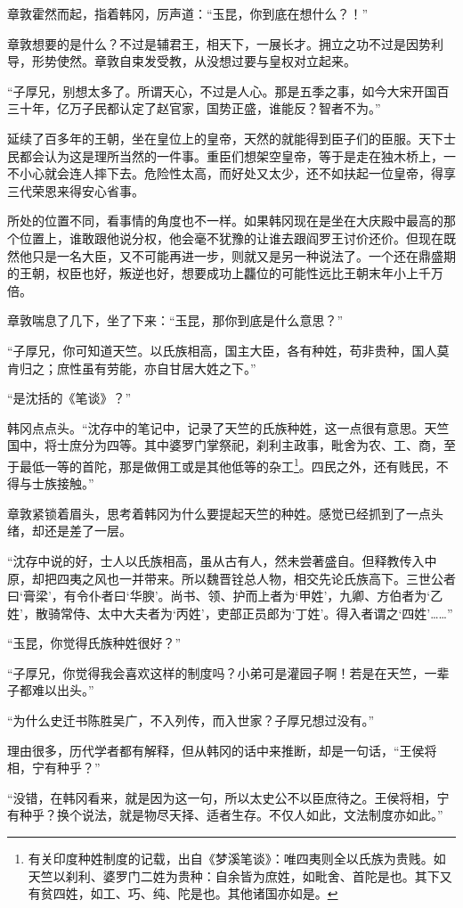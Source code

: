 章敦霍然而起，指着韩冈，厉声道：“玉昆，你到底在想什么？！”

章敦想要的是什么？不过是辅君王，相天下，一展长才。拥立之功不过是因势利导，形势使然。章敦自束发受教，从没想过要与皇权对立起来。

“子厚兄，别想太多了。所谓天心，不过是人心。那是五季之事，如今大宋开国百三十年，亿万子民都认定了赵官家，国势正盛，谁能反？智者不为。”

延续了百多年的王朝，坐在皇位上的皇帝，天然的就能得到臣子们的臣服。天下士民都会认为这是理所当然的一件事。重臣们想架空皇帝，等于是走在独木桥上，一不小心就会连人摔下去。危险性太高，而好处又太少，还不如扶起一位皇帝，得享三代荣恩来得安心省事。

所处的位置不同，看事情的角度也不一样。如果韩冈现在是坐在大庆殿中最高的那个位置上，谁敢跟他说分权，他会毫不犹豫的让谁去跟阎罗王讨价还价。但现在既然他只是一名大臣，又不可能再进一步，则就又是另一种说法了。一个还在鼎盛期的王朝，权臣也好，叛逆也好，想要成功上龘位的可能性远比王朝末年小上千万倍。

章敦喘息了几下，坐了下来：“玉昆，那你到底是什么意思？”

“子厚兄，你可知道天竺。以氏族相高，国主大臣，各有种姓，苟非贵种，国人莫肯归之；庶性虽有劳能，亦自甘居大姓之下。”

“是沈括的《笔谈》？”

韩冈点点头。“沈存中的笔记中，记录了天竺的氏族种姓，这一点很有意思。天竺国中，将士庶分为四等。其中婆罗门掌祭祀，刹利主政事，毗舍为农、工、商，至于最低一等的首陀，那是做佣工或是其他低等的杂工\footnote{有关印度种姓制度的记载，出自《梦溪笔谈》：唯四夷则全以氏族为贵贱。如天竺以刹利、婆罗门二姓为贵种：自余皆为庶姓，如毗舍、首陀是也。其下又有贫四姓，如工、巧、纯、陀是也。其他诸国亦如是。}。四民之外，还有贱民，不得与士族接触。”

章敦紧锁着眉头，思考着韩冈为什么要提起天竺的种姓。感觉已经抓到了一点头绪，却还是差了一层。

“沈存中说的好，士人以氏族相高，虽从古有人，然未尝著盛自。但释教传入中原，却把四夷之风也一并带来。所以魏晋铨总人物，相交先论氏族高下。三世公者曰‘膏梁’，有令仆者曰‘华腴’。尚书、领、护而上者为‘甲姓’，九卿、方伯者为‘乙姓’，散骑常侍、太中大夫者为‘丙姓’，吏部正员郎为‘丁姓’。得入者谓之‘四姓’……”

“玉昆，你觉得氏族种姓很好？”

“子厚兄，你觉得我会喜欢这样的制度吗？小弟可是灌园子啊！若是在天竺，一辈子都难以出头。”

“为什么史迁书陈胜吴广，不入列传，而入世家？子厚兄想过没有。”

理由很多，历代学者都有解释，但从韩冈的话中来推断，却是一句话，“王侯将相，宁有种乎？”

“没错，在韩冈看来，就是因为这一句，所以太史公不以臣庶待之。王侯将相，宁有种乎？换个说法，就是物尽天择、适者生存。不仅人如此，文法制度亦如此。”

